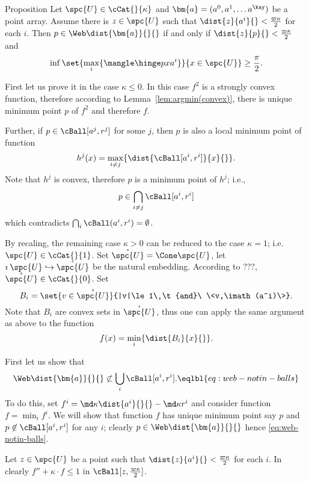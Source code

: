 \begin{thm}{Proposition}\label{prop:web-test}
Let $\spc{U}\in\cCat{}{\kappa}$
and $\bm{a}=(a^0,a^1,\dots a^\kay)$ be a point array.
Assume there is $z\in\spc{U}$ such that $\dist{z}{a^i}{}<\tfrac{\varpi\kappa}{2}$ for each $i$.
Then $p\in \Web \dist{\bm{a}}{}{}$ 
if and only if $\dist{z}{p}{}<\tfrac{\varpi\kappa}{2}$ and
$$\inf\set{\max_i\{\mangle\hinge p x {a^i}\}}{x\in \spc{U}}\ge \frac\pi2.
$$

\end{thm}








First let us prove it in the case $\kappa\le 0$.
In this case $f^2$ is a strongly convex function,
therefore according to Lemma~\ref{lem:argmin(convex)},
there is unique minimum point $p$ of $f^2$ and therefore $f$.

Further, if $p\in\cBall[a^j,r^j]$ for some $j$,
then $p$ is also a local minimum point of function 
$$h^j(x)=\max_{i\not=j}\{\dist{\cBall[a^i,r^i]}{x}{}\}.$$
Note that $h^j$ is convex, therefore $p$ is a minimum point of $h^j$;
i.e., $$p\in \bigcap_{i\not=j} \cBall[a^i,r^i]$$ 
which contradicts $\bigcap_i \cBall(a^i,r^i)=\emptyset$.

By recaling, the remaining case $\kappa>0$ can be reduced to the case $\kappa=1$;
i.e. $\spc{U}\in \cCat{}{1}$.
Set $\mathring{\spc{U}}=\Cone\spc{U}$,
let $\imath\:\spc{U}\hookrightarrow\mathring{\spc{U}}$ be the natural embedding.
According to ???, $\mathring{\spc{U}}\in \cCat{}{0}$.
Set $$B_i=\set{v\in\mathring{\spc{U}}}{|v|\le1\ \t{and}\ \<v,\imath(a^i)\>}.$$
Note that $B_i$ are convex sets in $\mathring{\spc{U}}$,
thus one can apply the same argument as above to the function 
$$f(x)=\min_i\{\dist{B_i}{x}{}\}.$$


First let us show that 
$$\Web\dist{\bm{a}}{}{}\not\subset \bigcup_i\cBall[a^i,r^i].
\eqlbl{eq:web-notin-balls}$$
To do this, set $f^i=\md\kappa\dist{a^i}{}{}-\md\kappa r^i$ 
and consider function $f=\min_i f^i$.
We will show that function $f$ has unique minimum point say $p$
and  $p\not\in \cBall[a^i,r^i]$ for any $i$;
clearly $p\in \Web\dist{\bm{a}}{}{}$ hence \ref{eq:web-notin-balls}.

Let $z\in\spc{U}$ be a point such that
$\dist{z}{a^i}{}<\tfrac{\varpi\kappa}2$ for each $i$.
In clearly  $f''+\kappa\cdot f\le 1$ in
$\cBall[z,\tfrac{\varpi\kappa}2]$.


